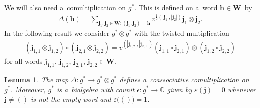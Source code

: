 \documentclass[pdftex]{sigma}
\numberwithin{equation}{section}
\newtheorem{Lemma}[Theorem]{Lemma}
\begin{document}
We will also need a~comultiplication on $g^*$.
This is def\/ined on a~word $\mathbf{h}\in\mathbf{W}$~by
\begin{gather*}
\Delta(\mathbf{h})=\sum\limits_{\mathbf{j}_1,\mathbf{j}_2\in\mathbf{W}:(\mathbf{j}_1,\mathbf{j}_2)=\mathbf{h}}
v^{\frac{1}{2}(|\mathbf{j}_1|,|\mathbf{j}_2|)}\mathbf{j}_1\otimes\mathbf{j}_2.
\end{gather*}
In the following result we consider $g^*\otimes g^*$ with the twisted multiplication
\begin{gather*}
(\mathbf{j}_{1,1}\otimes\mathbf{j}_{1,2})\circ(\mathbf{j}_{2,1}\otimes\mathbf{j}_{2,2})
=v^{(|\mathbf{j}_{1,2}|,|\mathbf{j}_{2,1}|)}(\mathbf{j}_{1,1}\circ\mathbf{j}_{2,1})\otimes(\mathbf{j}_{1,2}\circ\mathbf{j}_{2,2})
\end{gather*}
for all words $\mathbf{j}_{1,1}$, $\mathbf{j}_{1,2}$, $\mathbf{j}_{2,1}$, $\mathbf{j}_{2,2}\in\mathbf{W}$. %
\begin{Lemma}
The map $\Delta:g^*\to g^*\otimes g^*$ defines a~coassociative comultiplication on $g^*$.
Moreover, $g^*$ is a~bialgebra with counit $\epsilon:g^*\to\mathbb{C}$ given by $\varepsilon(\mathbf{j})=0$ whenever
$\mathbf{j}\ne()$ is not the empty word and $\varepsilon\big(()\big)=1$.
\end{Lemma}
\end{document}
